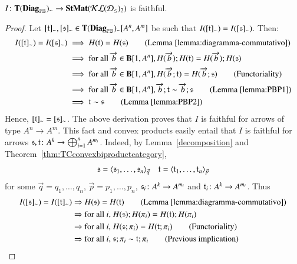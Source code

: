 \begin{theorem}\label{thm:completenessPBPtapes}
  $I\colon \mathbf{T}(\mathbf{Diag}_{\mathbb{PB}})_\sim \to \mathbf{StMat}(\mathcal{KL}(\mathcal{D}_{\leq})_2)$ is faithful.
\end{theorem}
\begin{proof}
  Let $[\mathfrak{t}]_\sim, [\mathfrak{s}]_\sim \in \mathbf{T}(\mathbf{Diag}_{\mathbb{PB}})_\sim[A^n,A^m]$ be such that $I([\mathfrak{t}]_\sim)=I([\mathfrak{s}]_\sim)$. Then: %
  \begin{align}
    I([\t]_\sim)=I([\s]_\sim) &\implies \comp(\t)=\comp(\s) \tag{Lemma \ref{lemma:diagramma-commutativo}}\\
    &\implies \text{for all } \overrightarrow{b}\in \Cat{B}[1,A^n], \comp(\overrightarrow{b});\comp(\t)=\comp(\overrightarrow{b});\comp(\s) \notag \\
    &\implies \text{for all } \overrightarrow{b}\in \Cat{B}[1,A^n], \comp(\overrightarrow{b};\t)=\comp(\overrightarrow{b};\s) \tag{Functoriality}\\
    &\implies \text{for all } \overrightarrow{b}\in \Cat{B}[1,A^n], \overrightarrow{b};\t \eqsyn \overrightarrow{b};\s \tag{Lemma \ref{lemma:PBP1}}\\
    &\implies \t \eqsyn \s \tag{Lemma \ref{lemma:PBP2}}
  \end{align}
  Hence, $[\mathfrak{t}]_\sim=[\mathfrak{s}]_\sim$. The above derivation proves that $I$ is faithful for arrows of type $A^n \to A^m$.  This fact and convex products easily entail that $I$ is faithful for arrows $\mathfrak{s},\mathfrak{t} \colon A^k \to \bigoplus_{i=1}^nA^{m_i}$. 
Indeed, by Lemma~\ref{decomposition} and Theorem~\ref{thm:TCconvexbiproductcategory}, 
\begin{equation}\label{eq:boh}\mathfrak{s}=\langle \mathfrak{s}_1, \dots, \mathfrak{s}_n \rangle_{\vec{q}} \quad \mathfrak{t}=\langle \mathfrak{t}_1, \dots, \mathfrak{t}_n \rangle_{\vec{p}}\end{equation} 
for some $\vec{q}=q_1,\dots, q_n$, $\vec{p}=p_1,\dots, p_n$, $\mathfrak{s}_i \colon A^k \to A^{m_i}$ and $\mathfrak{t}_i \colon A^k \to A^{m_i}$. Thus
\begin{align*}
I([\s]_\eqsyn) = I([\t]_\eqsyn) & \Rightarrow \comp(\s)=\comp(\t) \tag{Lemma \ref{lemma:diagramma-commutativo}}\\
& \Rightarrow \text{for all }i \text{, } \comp(\s);\comp(\pi_i)=\comp(\t);\comp(\pi_i) \\
& \Rightarrow \text{for all }i\text{, } \comp(\s;\pi_i)=\comp(\t;\pi_i) \tag{Functoriality} \\
& \Rightarrow  \text{for all }i\text{, }  \s;\pi_i\sim\t;\pi_i \tag{Previous implication}\\

\end{align*}
\end{proof}
